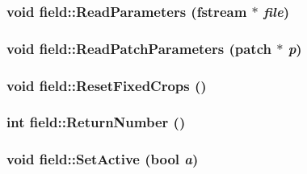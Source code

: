 \label{classfield_a51e15b1581712c50d383f2c64a3cc203}
\hypertarget{classfield_a52be92c175965887ed3f016cb7c683fe}{
\subsubsection[{ReadParameters}]{\setlength{\rightskip}{0pt plus 5cm}void field::ReadParameters (fstream $\ast$ {\em file})}}
\label{classfield_a52be92c175965887ed3f016cb7c683fe}
\hypertarget{classfield_a7eb47d106515b522ec6a8c117ab19db9}{
\subsubsection[{ReadPatchParameters}]{\setlength{\rightskip}{0pt plus 5cm}void field::ReadPatchParameters ({\bf patch} $\ast$ {\em p})}}
\label{classfield_a7eb47d106515b522ec6a8c117ab19db9}
\hypertarget{classfield_a1546aa77b3b2f65bde8d168bb7421075}{
\subsubsection[{ResetFixedCrops}]{\setlength{\rightskip}{0pt plus 5cm}void field::ResetFixedCrops ()}}
\label{classfield_a1546aa77b3b2f65bde8d168bb7421075}
\hypertarget{classfield_ae217e8d00b4c340b9aa7ace73f69f1db}{
\subsubsection[{ReturnNumber}]{\setlength{\rightskip}{0pt plus 5cm}int field::ReturnNumber ()}}
\label{classfield_ae217e8d00b4c340b9aa7ace73f69f1db}
\hypertarget{classfield_a1e6214765a7a3851aaa23c54e5270b8b}{
\subsubsection[{SetActive}]{\setlength{\rightskip}{0pt plus 5cm}void field::SetActive (bool {\em a})}}
